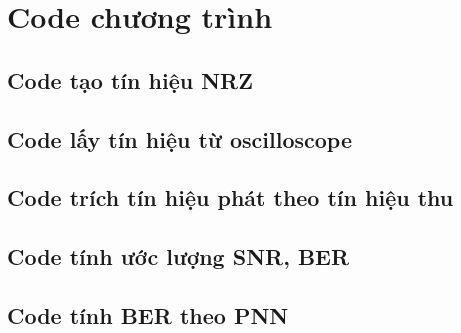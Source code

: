 
\chapter{Code chương trình}

\section{Code tạo tín hiệu NRZ}



\section{Code lấy tín hiệu từ oscilloscope}



\section{Code trích tín hiệu phát theo tín hiệu thu}



\section{Code tính ước lượng SNR, BER}



\section{Code tính BER theo PNN}






